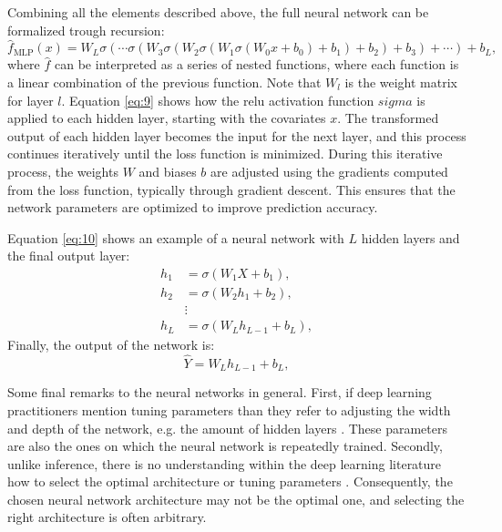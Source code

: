 Combining all the elements described above, the full neural network can be formalized trough recursion:
\begin{equation}
\hat{f}_{\text{MLP}}(x) = W_L \sigma \left( \cdots \sigma \left( W_3 \sigma \left( W_2 \sigma \left( W_1 \sigma \left( W_0 x + b_0 \right) + b_1 \right) + b_2 \right) + b_3 \right) + \cdots \right) + b_L,
\label{eq:9}
\end{equation}
where $\hat{f}$ can be interpreted as a series of nested functions, where each function is a linear combination of the previous function.
Note that $W_l$ is the weight matrix for layer $l$.
Equation \ref{eq:9} shows how the \ac{relu} activation function $sigma$ is applied to each hidden layer, starting with the covariates $x$.
The transformed output of each hidden layer becomes the input for the next layer, and this process continues iteratively until the loss function is minimized.
During this iterative process, the weights $W$ and biases $b$ are adjusted using the gradients computed from the loss function, typically through gradient descent.
This ensures that the network parameters are optimized to improve prediction accuracy.

Equation \ref{eq:10} shows an example of a neural network with $L$ hidden layers and the final output layer:
\begin{align}
h_1 &= \sigma(W_1 X + b_1), \nonumber \\
h_2 &= \sigma(W_2 h_1 + b_2), \nonumber  \\
&\vdots \nonumber \\
h_L &= \sigma(W_L h_{L-1} + b_L),
\label{eq:10}
\end{align}
Finally, the output of the network is:
\begin{equation}
\hat{Y} = W_L h_{L-1} + b_L, \nonumber
\end{equation}



Some final remarks to the neural networks in general.
First, if deep learning practitioners mention tuning parameters than they refer to adjusting the width and depth of the network, e.g. the amount of hidden layers \citep{farrellDeepNeuralNetworks2021}.
These parameters are also the ones on which the neural network is repeatedly trained.
Secondly, unlike inference, there is no understanding within the deep learning literature how to select the optimal architecture or tuning parameters \citep[see][]{10.1214/19-AOS1875,telgarsky2016benefits}.
Consequently, the chosen neural network architecture may not be the optimal one, and selecting the right architecture is often arbitrary.
